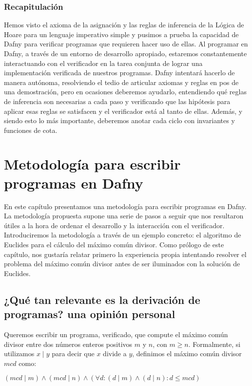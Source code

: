 \documentclass[12pt, a4paper, openany, fleqn]{book}
\begin{document}
    \subsection{Recapitulación}
    Hemos visto el axioma de la asignación y las reglas de inferencia de la Lógica de Hoare para un lenguaje imperativo simple y pusimos a prueba la capacidad de Dafny para verificar programas que requieren hacer uso de ellas. Al programar en Dafny, a través de un entorno de desarrollo apropiado, estaremos constantemente interactuando con el verificador en la tarea conjunta de lograr una implementación verificada de nuestros programas. Dafny intentará hacerlo de manera autónoma, resolviendo el tedio de articular axiomas y reglas en pos de una demostración, pero en ocasiones deberemos ayudarlo, entendiendo qué reglas de inferencia son necesarias a cada paso y verificando que las hipótesis para aplicar esas reglas se satisfacen y el verificador está al tanto de ellas. Además, y siendo esto lo más importante, deberemos anotar cada ciclo con invariantes y funciones de cota.

    \chapter{Metodología para escribir programas en Dafny}
    En este capítulo presentamos una metodología para escribir programas en Dafny. La metodología propuesta supone una serie de pasos a seguir que nos resultaron útiles a la hora de ordenar el desarrollo y la interacción con el verificador.
    Introduciremos la metodología a través de un ejemplo concreto: el algoritmo de Euclides para el cálculo del máximo común divisor. Como prólogo de este capítulo, nos gustaría relatar primero la experiencia propia intentando resolver el problema del máximo común divisor antes de ser iluminados con la solución de Euclides.

    \section{¿Qué tan relevante es la derivación de programas? una opinión personal}
    Queremos escribir un programa, verificado, que compute el máximo común divisor entre dos números enteros positivos $m$ y $n$, con $m \geqslant n$. Formalmente, si utilizamos $x \mid y$ para decir que $x$ divide a $y$, definimos el máximo común divisor $mcd$ como:

    \begin{center}
        \begin{math}
            (mcd \mid m) \land (mcd \mid n) \land (\forall d: (d \mid m) \land (d \mid n) : d \leq mcd)
        \end{math}
    \end{center}
\end{document}

